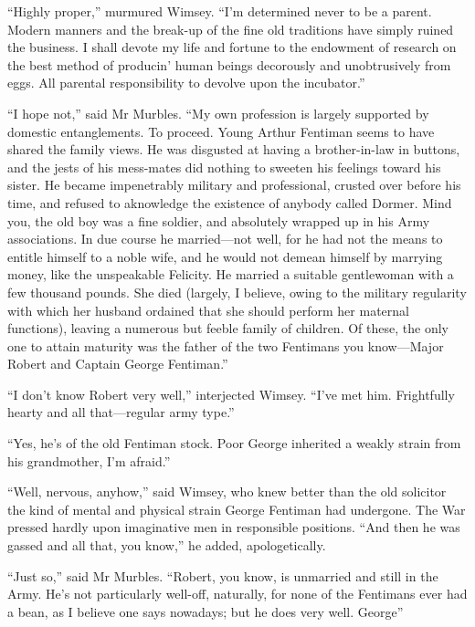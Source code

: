 \enquote{Highly proper,} murmured Wimsey. \enquote{I'm determined never to be a parent. Modern manners and the break-up of the fine old traditions have simply ruined the business. I shall devote my life and fortune to the endowment of research on the best method of producin' human beings decorously and unobtrusively from eggs. All parental responsibility to devolve upon the incubator.}

\enquote{I hope not,} said Mr Murbles. \enquote{My own profession is largely supported by domestic entanglements. To proceed. Young Arthur Fentiman seems to have shared the family views. He was disgusted at having a brother-in-law in buttons, and the jests of his mess-mates did nothing to sweeten his feelings toward his sister. He became impenetrably military and professional, crusted over before his time, and refused to aknowledge the existence of anybody called Dormer. Mind you, the old boy was a fine soldier, and absolutely wrapped up in his Army associations. In due course he married\allowbreak---\allowbreak not well, for he had not the means to entitle himself to a noble wife, and he would not demean himself by marrying money, like the unspeakable Felicity. He married a suitable gentlewoman with a few thousand pounds. She died (largely, I believe, owing to the military regularity with which her husband ordained that she should perform her maternal functions), leaving a numerous but feeble family of children. Of these, the only one to attain maturity was the father of the two Fentimans you know\allowbreak---\allowbreak Major Robert and Captain George Fentiman.}

\enquote{I don't know Robert very well,} interjected Wimsey. \enquote{I've met him. Frightfully hearty and all that\allowbreak---\allowbreak regular army type.}

\enquote{Yes, he's of the old Fentiman stock. Poor George inherited a weakly strain from his grandmother, I'm afraid.}

\enquote{Well, nervous, anyhow,} said Wimsey, who knew better than the old solicitor the kind of mental and physical strain George Fentiman had undergone. The War pressed hardly upon imaginative men in responsible positions. \enquote{And then he was gassed and all that, you know,} he added, apologetically.

\enquote{Just so,} said Mr Murbles. \enquote{Robert, you know, is unmarried and still in the Army. He's not particularly well-off, naturally, for none of the Fentimans ever had a bean, as I believe one says nowadays; but he does very well. George\longdash}

